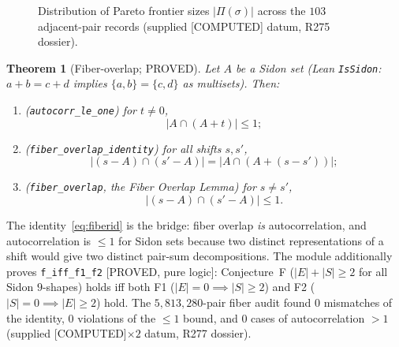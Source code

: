 \documentclass[11pt,a4paper]{article}
\newtheorem{theorem}{Theorem}
\theoremstyle{definition}
\begin{document}
\begin{figure}[t]
  \centering
  \caption{Distribution of Pareto frontier sizes $|\Pi(\sigma)|$ across
    the $103$ adjacent-pair records (supplied [COMPUTED] datum, R275
    dossier).}
  \label{fig:frontierbars}
\end{figure}

\begin{theorem}[Fiber-overlap; PROVED]
  \label{thm:fiberoverlap}
  Let $A$ be a Sidon set (Lean \texttt{IsSidon}: $a+b=c+d$ implies
  $\{a,b\}=\{c,d\}$ as multisets). Then:
  \begin{enumerate}
  \item (\texttt{autocorr\_le\_one}) for $t\neq0$,
    \begin{equation}
      \label{eq:autocorr}
      |A\cap(A+t)|\le1;
    \end{equation}
  \item (\texttt{fiber\_overlap\_identity}) for all shifts $s,s'$,
    \begin{equation}
      \label{eq:fiberid}
      |(s-A)\cap(s'-A)|=|A\cap(A+(s-s'))|;
    \end{equation}
  \item (\texttt{fiber\_overlap}, the Fiber Overlap Lemma) for
    $s\neq s'$,
    \begin{equation}
      \label{eq:fiberoverlap}
      |(s-A)\cap(s'-A)|\le1.
    \end{equation}
  \end{enumerate}
\end{theorem}

The identity~\eqref{eq:fiberid} is the bridge: fiber overlap
\emph{is} autocorrelation, and autocorrelation is $\le1$ for Sidon sets
because two distinct representations of a shift would give two distinct
pair-sum decompositions. The module additionally proves
\texttt{f\_iff\_f1\_f2} [PROVED, pure logic]: Conjecture~F
($|E|+|S|\ge2$ for all Sidon $9$-shapes) holds iff both F1
($|E|=0\implies|S|\ge2$) and F2 ($|S|=0\implies|E|\ge2$) hold. The
$5{,}813{,}280$-pair fiber audit found $0$ mismatches of the identity,
$0$ violations of the $\le1$ bound, and $0$ cases of autocorrelation
$>1$ (supplied [COMPUTED]$\times2$ datum, R277 dossier).
\end{document}
